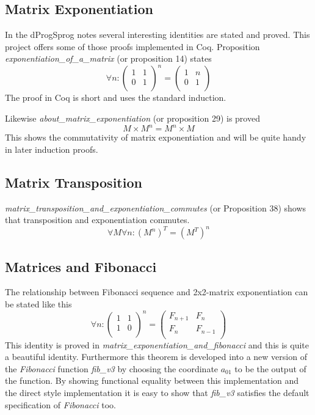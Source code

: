 \documentclass[9pt,a4paper,oneside]{article}
\begin{document}
\subsection{Matrix Exponentiation}
In the dProgSprog notes several interesting identities are stated and proved. This project offers some of those proofs implemented in Coq. 
Proposition \textit{exponentiation\_of\_a\_matrix} (or proposition 14) states
$$\forall n:
\begin{pmatrix}
  1 & 1  \\
  0 & 1  \\
\end{pmatrix}^n=
\begin{pmatrix}
  1 & n  \\
  0 & 1  \\
\end{pmatrix}$$
The proof in Coq is short and uses the standard induction.

Likewise \textit{about\_matrix\_exponentiation} (or proposition 29) is proved
$$M\times M^n=M^n\times M$$
This shows the commutativity of matrix exponentiation and will be quite
handy in later induction proofs.

\subsection{Matrix Transposition}
\textit{matrix\_transposition\_and\_exponentiation\_commutes} (or Proposition 38) shows that transposition and exponentiation commutes.
$$\forall M\forall n: (M^n)^T=(M^T)^n$$

\subsection{Matrices and Fibonacci}

The relationship between Fibonacci sequence and 2x2-matrix exponentiation can be stated like this
$$\forall n:
 \begin{pmatrix}
  1 & 1  \\
  1 & 0  \\
 \end{pmatrix}^n=
  \begin{pmatrix}
  F_{n+1} & F_n  \\
  F_n & F_{n-1}  \\
 \end{pmatrix}$$
This identity is proved in \textit{matrix\_exponentiation\_and\_fibonacci} and this is quite a beautiful identity.
Furthermore this theorem is developed into a new version of the \textit{Fibonacci} function \textit{fib\_v3} by choosing the coordinate $a_{01}$ to be the output of the function. 
By showing functional equality between this implementation and the direct style implementation it is easy to show that \textit{fib\_v3} satisfies the default specification of \textit{Fibonacci} too.
\end{document}
